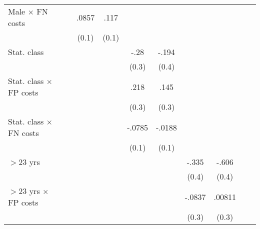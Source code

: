 \begin{table}[htbp]
\begin{tabular}{l*{9}{c}}
Male $\times$ FN costs&                  &    .0857         &     .117         &                  &                  &                  &                  &                  &                  \\
                &                  &    (0.1)         &    (0.1)         &                  &                  &                  &                  &                  &                  \\
Stat. class     &                  &                  &                  &     -.28         &    -.194         &                  &                  &                  &                  \\
                &                  &                  &                  &    (0.3)         &    (0.4)         &                  &                  &                  &                  \\
Stat. class $\times$ FP costs&                  &                  &                  &     .218         &     .145         &                  &                  &                  &                  \\
                &                  &                  &                  &    (0.3)         &    (0.3)         &                  &                  &                  &                  \\
Stat. class $\times$ FN costs&                  &                  &                  &   -.0785         &   -.0188         &                  &                  &                  &                  \\
                &                  &                  &                  &    (0.1)         &    (0.1)         &                  &                  &                  &                  \\
$>$23 yrs       &                  &                  &                  &                  &                  &    -.335         &    -.606         &                  &                  \\
                &                  &                  &                  &                  &                  &    (0.4)         &    (0.4)         &                  &                  \\
$>$23 yrs $\times$ FP costs&                  &                  &                  &                  &                  &   -.0837         &   .00811         &                  &                  \\
                &                  &                  &                  &                  &                  &    (0.3)         &    (0.3)         &                  &                  \\

\end{tabular}
\end{table}
